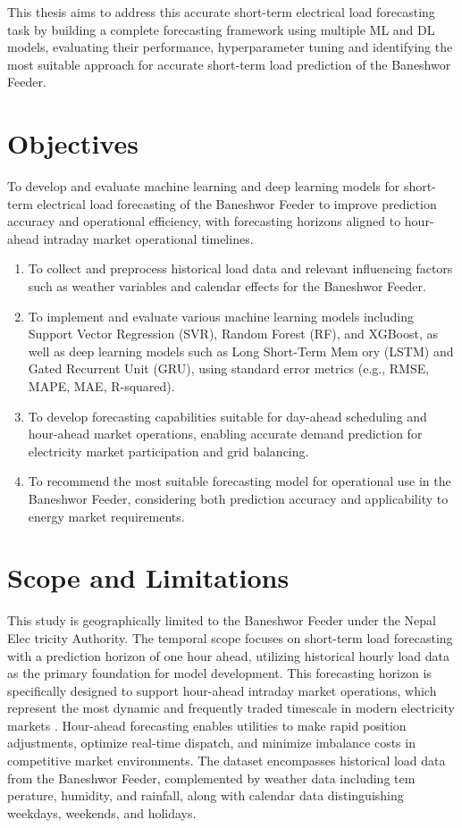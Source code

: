 \documentclass[oneside, 12pt]{book}
\numberwithin{equation}{chapter}
\newcommand{\sizexii}{\fontsize{12pt}{6pt}\selectfont}
\begin{document}
This thesis aims to address this accurate short-term electrical load forecasting
task by building a complete forecasting framework using multiple ML and DL models,
evaluating their performance, hyperparameter tuning and identifying the most suitable approach for accurate short-term load prediction of the Baneshwor Feeder.



\section{\sizexii Objectives}
To develop and evaluate machine learning and deep learning models for short-term
electrical load forecasting of the Baneshwor Feeder to improve prediction accuracy
and operational efficiency, with forecasting horizons aligned to hour-ahead intraday market operational timelines.
\begin{enumerate}
	\item To collect and preprocess historical load data and relevant influencing factors
	such as weather variables and calendar effects for the Baneshwor Feeder.
	\item To implement and evaluate various machine learning models including Support
	Vector Regression (SVR), Random Forest (RF), and XGBoost, as well as deep
	learning models such as Long Short-Term Mem
	ory (LSTM) and Gated Recurrent Unit (GRU), using standard error metrics (e.g., RMSE, MAPE, MAE, R-squared).
	\item To develop forecasting capabilities suitable for day-ahead scheduling and hour-ahead market operations, enabling accurate demand prediction for electricity market participation and grid balancing.
	\item To recommend the most suitable forecasting model for operational use in the
	Baneshwor Feeder, considering both prediction accuracy and applicability to energy market requirements.
\end{enumerate}

\section{\sizexii Scope and Limitations}
This study is geographically limited to the Baneshwor Feeder under the Nepal Elec
tricity Authority. The temporal scope focuses on short-term load forecasting with a
prediction horizon of one hour ahead, utilizing historical hourly load data as
the primary foundation for model development. This forecasting horizon is specifically designed to support hour-ahead intraday market operations, which represent the most dynamic and frequently traded timescale in modern electricity markets \parencite{weron2014electricity}. Hour-ahead forecasting enables utilities to make rapid position adjustments, optimize real-time dispatch, and minimize imbalance costs in competitive market environments. The dataset encompasses historical
load data from the Baneshwor Feeder, complemented by weather data including tem
perature, humidity, and rainfall, along with calendar data distinguishing weekdays,
weekends, and holidays.
\end{document}
